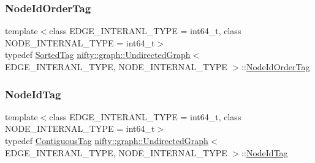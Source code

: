 \mbox{\label{classnifty_1_1graph_1_1UndirectedGraph_a0756fdeac9df76a32f46f2969ffacd80}} 
\subsubsection{\texorpdfstring{Node\+Id\+Order\+Tag}{NodeIdOrderTag}}
{\footnotesize\ttfamily template$<$class E\+D\+G\+E\+\_\+\+I\+N\+T\+E\+R\+A\+N\+L\+\_\+\+T\+Y\+PE = int64\+\_\+t, class N\+O\+D\+E\+\_\+\+I\+N\+T\+E\+R\+N\+A\+L\+\_\+\+T\+Y\+PE = int64\+\_\+t$>$ \\
typedef \hyperlink{structnifty_1_1graph_1_1SortedTag}{Sorted\+Tag} \hyperlink{classnifty_1_1graph_1_1UndirectedGraph}{nifty\+::graph\+::\+Undirected\+Graph}$<$ E\+D\+G\+E\+\_\+\+I\+N\+T\+E\+R\+A\+N\+L\+\_\+\+T\+Y\+PE, N\+O\+D\+E\+\_\+\+I\+N\+T\+E\+R\+N\+A\+L\+\_\+\+T\+Y\+PE $>$\+::\hyperlink{classnifty_1_1graph_1_1UndirectedGraph_a0756fdeac9df76a32f46f2969ffacd80}{Node\+Id\+Order\+Tag}}

\mbox{\label{classnifty_1_1graph_1_1UndirectedGraph_a5d11b1e802f0be2f967b62f7ea5ff61e}} 
\subsubsection{\texorpdfstring{Node\+Id\+Tag}{NodeIdTag}}
{\footnotesize\ttfamily template$<$class E\+D\+G\+E\+\_\+\+I\+N\+T\+E\+R\+A\+N\+L\+\_\+\+T\+Y\+PE = int64\+\_\+t, class N\+O\+D\+E\+\_\+\+I\+N\+T\+E\+R\+N\+A\+L\+\_\+\+T\+Y\+PE = int64\+\_\+t$>$ \\
typedef \hyperlink{structnifty_1_1graph_1_1ContiguousTag}{Contiguous\+Tag} \hyperlink{classnifty_1_1graph_1_1UndirectedGraph}{nifty\+::graph\+::\+Undirected\+Graph}$<$ E\+D\+G\+E\+\_\+\+I\+N\+T\+E\+R\+A\+N\+L\+\_\+\+T\+Y\+PE, N\+O\+D\+E\+\_\+\+I\+N\+T\+E\+R\+N\+A\+L\+\_\+\+T\+Y\+PE $>$\+::\hyperlink{classnifty_1_1graph_1_1UndirectedGraph_a5d11b1e802f0be2f967b62f7ea5ff61e}{Node\+Id\+Tag}}


